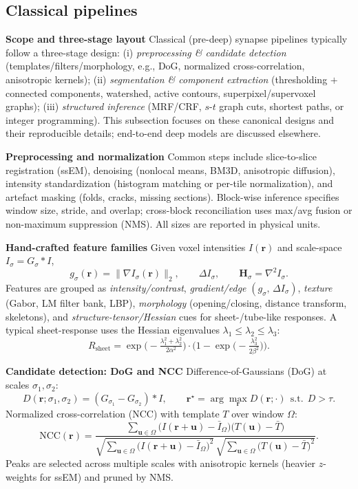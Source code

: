 \medskip

\subsection{Classical pipelines}

\noindent\textbf{Scope and three-stage layout}\;
Classical (pre-deep) synapse pipelines typically follow a three-stage design:
(i) \emph{preprocessing \& candidate detection} (templates/filters/morphology, e.g., DoG, normalized cross-correlation, anisotropic kernels);
(ii) \emph{segmentation \& component extraction} (thresholding \(+\) connected components, watershed, active contours, superpixel/supervoxel graphs);
(iii) \emph{structured inference} (MRF/CRF, \(s\)-\(t\) graph cuts, shortest paths, or integer programming).
This subsection focuses on these canonical designs and their reproducible details; end-to-end deep models are discussed elsewhere.

\medskip
\noindent\textbf{Preprocessing and normalization}\;
Common steps include slice-to-slice registration (ssEM), denoising (nonlocal means, BM3D, anisotropic diffusion), intensity standardization (histogram matching or per-tile normalization), and artefact masking (folds, cracks, missing sections).
Block-wise inference specifies window size, stride, and overlap; cross-block reconciliation uses max/avg fusion or non-maximum suppression (NMS).
All sizes are reported in physical units.

\medskip
\noindent\textbf{Hand-crafted feature families}\;
Given voxel intensities \(I(\mathbf r)\) and scale-space \(I_\sigma = G_\sigma * I\),
\[
g_\sigma(\mathbf r)=\lVert \nabla I_\sigma(\mathbf r)\rVert_2,\qquad
\Delta I_\sigma,\qquad
\mathbf H_\sigma=\nabla^2 I_\sigma.
\]
Features are grouped as \emph{intensity/contrast}, \emph{gradient/edge} \((g_\sigma,\,\Delta I_\sigma)\), \emph{texture} (Gabor, LM filter bank, LBP), \emph{morphology} (opening/closing, distance transform, skeletons), and \emph{structure-tensor/Hessian} cues for sheet-/tube-like responses.
A typical sheet-response uses the Hessian eigenvalues \(\lambda_1\le\lambda_2\le\lambda_3\):
\[
R_{\text{sheet}}
=\exp\!\Big(-\tfrac{\lambda_1^2+\lambda_2^2}{2\alpha^2}\Big)\cdot
\Big(1-\exp\!\big(-\tfrac{\lambda_3^2}{2\beta^2}\big)\Big).
\]

\medskip
\noindent\textbf{Candidate detection: DoG and NCC}\;
Difference-of-Gaussians (DoG) at scales \(\sigma_1,\sigma_2\):
\[
D(\mathbf r;\sigma_1,\sigma_2)=(G_{\sigma_1}-G_{\sigma_2})*I,\qquad
\mathbf r^\star=\arg\max_{\mathbf r} D(\mathbf r;\cdot)\ \ \text{s.t.}\ \ D>\tau.
\]
Normalized cross-correlation (NCC) with template \(T\) over window \(\Omega\):
\[
\mathrm{NCC}(\mathbf r)=
\frac{\sum_{\mathbf u\in\Omega}\!\big(I(\mathbf r+\mathbf u)-\bar I_\Omega\big)\big(T(\mathbf u)-\bar T\big)}
{\sqrt{\sum_{\mathbf u\in\Omega}\!\big(I(\mathbf r+\mathbf u)-\bar I_\Omega\big)^2}\,
 \sqrt{\sum_{\mathbf u\in\Omega}\!\big(T(\mathbf u)-\bar T\big)^2}}.
\]
Peaks are selected across multiple scales with anisotropic kernels (heavier \(z\)-weights for ssEM) and pruned by NMS.

